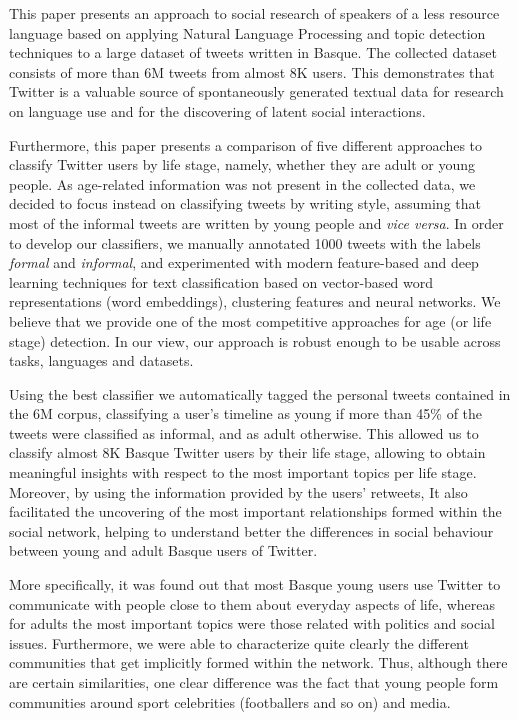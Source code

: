 \documentclass[information,article,submit,moreauthors,pdftex,10pt,a4paper]{Definitions/mdpi}
\begin{document}
This paper presents an approach to social research of speakers of a less resource language based on applying Natural Language Processing and topic detection techniques to a large dataset of tweets written in Basque. The collected dataset consists of more than 6M tweets from almost 8K users. This demonstrates that Twitter is a valuable source of spontaneously generated textual data for research on language use and for the discovering of latent social interactions.

Furthermore, this paper presents a comparison of five different approaches to classify Twitter users by life stage, namely, whether they are adult or young people. As age-related information was not present in the collected data, we decided to focus instead on classifying tweets by writing style, assuming that most of the informal tweets are written by young people and \emph{vice versa}. In order to develop our classifiers, we manually annotated 1000 tweets with the labels \emph{formal} and \emph{informal}, and experimented with modern feature-based and deep learning techniques for text classification based on vector-based word representations (word embeddings), clustering features and neural networks. We believe that we provide one of the most competitive approaches for age (or life stage) detection. In our view, our approach is robust enough to be usable across tasks, languages and datasets.

Using the best classifier we automatically tagged the personal tweets contained in the 6M corpus, classifying a user's timeline as young if more than 45\% of the tweets were classified as informal, and as adult otherwise. This allowed us to classify almost 8K Basque Twitter users by their life stage, allowing to obtain meaningful insights with respect to the most important topics per life stage. Moreover, by using the information provided by the users' retweets, It also facilitated the uncovering of the most important relationships formed within the social network, helping to understand better the differences in social behaviour between young and adult Basque users of Twitter.

More specifically, it was found out that most Basque young users use Twitter to communicate with people close to them about everyday aspects of life, whereas for adults the most important topics were those related with politics and social issues. Furthermore, we were able to characterize quite clearly the different communities that get implicitly formed within the network. Thus, although there are certain similarities, one clear difference was the fact that young people form communities around sport celebrities (footballers and so on) and media.
\end{document}
